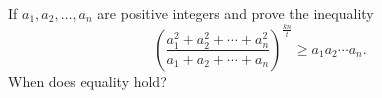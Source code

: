 If $a_1, a_2, \ldots , a_n$ are positive integers and   prove the inequality
\[\left(\frac{a_1^2+a_2^2+\cdots+a_n^2}{a_1+a_2+\cdots+a_n}\right)^{\frac{kn}{t}} \geq a_1a_2\cdots a_n.\]
When does equality hold?